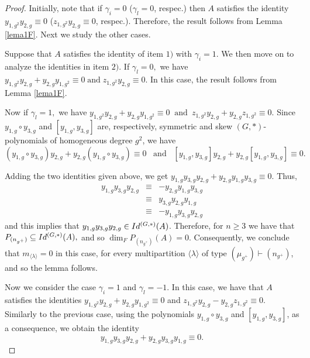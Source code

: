\documentclass[10pt,a4paper]{amsart}
\newcommand{\IdG}{\ensuremath{\textnormal{Id}^{(G,\ast)}}}
\begin{document}
\begin{proof}

    Initially, note that if $\gamma_{i} = 0$ ($\gamma_l=0$, respec.) then $A$ satisfies the identity $y_{1,g^2}y_{2,g}\equiv 0$ ($z_{1,g^2}y_{2,g}\equiv 0$, respec.). Therefore, the result follows from Lemma \ref{lema1F}. Next we study the other cases.
    
    Suppose that $A$ satisfies the identity of item $1)$ with $\gamma_{i}=1$. We then move on to analyze the identities in item $2)$. 
    If $\gamma_{l}=0,$ we have  $y_{1,g^2}y_{2,g}+y_{2,g}y_{1,g^2} \equiv 0 \; \mbox{and}\;z_{1,g^2}y_{2,g}  \equiv 0. $ In this case, the result follows from Lemma \ref{lema1F}. 

   	Now if $\gamma_{l}=1,$ we have  
$y_{1,g^2}y_{2,g}+y_{2,g}y_{1,g^2}\equiv 0 \;\;\mbox{and}\;\ z_{1,g^2}y_{2,g}+y_{2,g}z_{1,g^2}\equiv 0.$  
Since $y_{1,g}\circ y_{3,g}$ and $[y_{1,g},y_{3,g}]$ are, respectively, symmetric and skew $(G,*)$-polynomials of homogeneous degree $g^2$, we have
$$(y_{1,g}\circ y_{3,g})y_{2,g}+y_{2,g}(y_{1,g}\circ y_{3,g})\equiv 0 \;\;\;\mbox{and}\;\;\; [y_{1,g},y_{3,g}]y_{2,g}+y_{2,g}[y_{1,g},y_{3,g}]\equiv 0.$$    

 Adding the two identities given above, we get 
$y_{1,g}y_{3,g}y_{2,g}+y_{2,g}y_{1,g}y_{3,g}\equiv 0.$  
 Thus,
$$ 
    \begin{array}{ccl}y_{1,g}y_{3,g}y_{2,g}& \equiv& -y_{2,g}y_{1,g}y_{3,g}\\ & \equiv & y_{3,g}y_{2,g}y_{1,g} \\ & \equiv& -y_{1,g}y_{3,g}y_{2,g}\end{array}$$
	and this implies that  $y_{1,g}y_{3,g}y_{2,g}\in \IdG(A)$.
	Therefore, for $n \ge 3$ we have that $P_{(n_{g^+})} \subseteq \IdG(A),$ and so $\dim_FP_{(n_{g^+})}(A)=0$. Consequently, we conclude that $m_{\langle \lambda \rangle}= 0$ in this case, for every multipartition $\langle \lambda \rangle$ of type $(\mu_{g^+})\vdash (n_{g^+})$, and so the lemma follows. 
     

	Now we consider the case $\gamma_{i}=1$ and $\gamma_{l}=-1$. In this case, we have that $A$ satisfies the identities 	$	y_{1,g^2}y_{2,g}+y_{2,g}y_{1,g^2}\equiv 0$ and 
$	z_{1,g^2}y_{2,g}-y_{2,g}z_{1,g^2}\equiv 0. $
  Similarly to the previous case, using the polynomials $y_{1,g}\circ y_{3,g}$ and $[y_{1,g},y_{3,g}]$, as a consequence,  we obtain the identity 
    	\begin{equation} \label{eq7F}
y_{1,g}y_{3,g}y_{2,g}+y_{2,g}y_{3,g}y_{1,g} \equiv 0.
	\end{equation}	
    

\end{proof}
\end{document}
